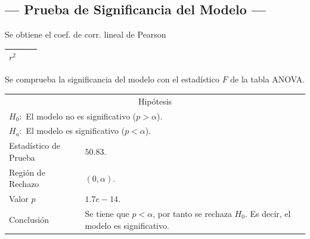 \subsection{--- Prueba de Significancia del Modelo ---} %
Se obtiene el coef. de corr. lineal de Pearson
\begin{table}[hbtp!]
	\centering
	\begin{tabular}{|p{2cm}|p{2cm}|p{10cm}|}
		\hline 
		\(r ^ 2\) &  \\ \hline
	\end{tabular}
\end{table}
Se comprueba la significancia del modelo con el estadístico \(F\) de la tabla ANOVA.
\begin{center}
  \begin{tabular}{|l|p{11cm}|}
    \cline{1-2}
    \multicolumn{2}{|c|}{Hipótesis}\\ \cline{1-2}
		\multicolumn{2}{|l|}{\(H_0:\) El modelo no es significativo (\(p> \alpha\)).} \\ 
		\multicolumn{2}{|l|}{\(H_a:\) El modelo es significativo (\(p< \alpha\)).} \\ \cline{1-2}
    Estadístico de Prueba & \(50.83\).\\ \cline{1-2} 
    Región de Rechazo & \((0, \alpha )\).\\ \cline{1-2} 
    Valor \(p\) & \(1.7e-14\).\\ \cline{1-2} 
    Conclusión & Se tiene que \(p<\alpha\), por tanto se rechaza \(H_0\). Es decir, el modelo es significativo.\\ \cline{1-2} 
  \end{tabular}
\end{center} 



